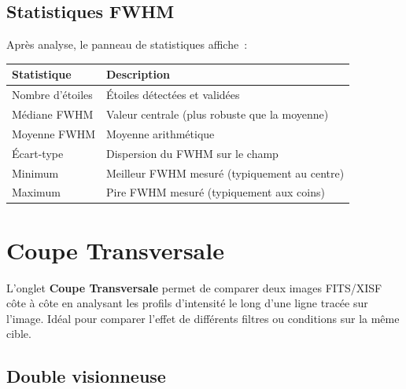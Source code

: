 \documentclass[a4paper,11pt]{article}
\begin{document}
\subsection{Statistiques FWHM}

Apr\`{e}s analyse, le panneau de statistiques affiche~:

\begin{center}
\begin{tabularx}{0.85\textwidth}{l X}
\toprule
\textbf{Statistique} & \textbf{Description} \\
\midrule
Nombre d'\'{e}toiles & \'{E}toiles d\'{e}tect\'{e}es et valid\'{e}es \\
M\'{e}diane FWHM & Valeur centrale (plus robuste que la moyenne) \\
Moyenne FWHM & Moyenne arithm\'{e}tique \\
\'{E}cart-type & Dispersion du FWHM sur le champ \\
Minimum & Meilleur FWHM mesur\'{e} (typiquement au centre) \\
Maximum & Pire FWHM mesur\'{e} (typiquement aux coins) \\
\bottomrule
\end{tabularx}
\end{center}


\section{Coupe Transversale}
\label{sec:coupe}

\begin{tcolorbox}[
    enhanced, colback=successgreen!8, colframe=successgreen!60,
    coltitle=white, fonttitle=\bfseries,
    title={NOUVEAU dans v1.3.0}
]
L'onglet \textbf{Coupe Transversale} permet de comparer deux images FITS/XISF c\^{o}te \`{a} c\^{o}te en analysant les profils d'intensit\'{e} le long d'une ligne trac\'{e}e sur l'image. Id\'{e}al pour comparer l'effet de diff\'{e}rents filtres ou conditions sur la m\^{e}me cible.
\end{tcolorbox}

\subsection{Double visionneuse}
\end{document}
